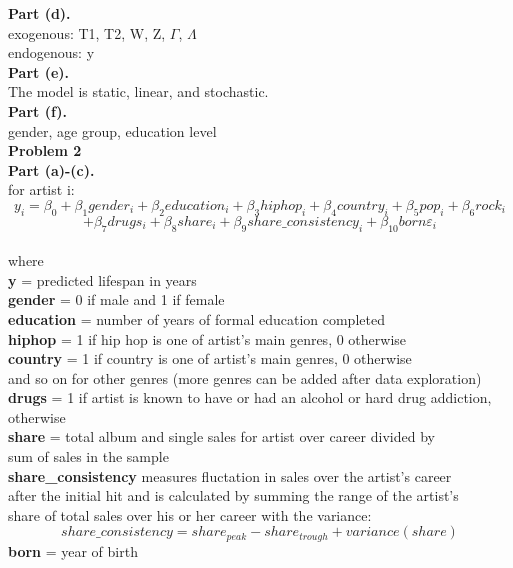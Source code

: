 \documentclass[letterpaper,12pt]{article}
\theoremstyle{definition}
\begin{document}
\noindent\textbf {Part (d).} \\
exogenous: T1, T2, W, Z, \(\Gamma \), \(\Lambda \) \\
endogenous: y \\

\noindent
\textbf {Part (e).} \\
The model is static, linear, and stochastic. \\

\noindent
\textbf {Part (f).} \\
gender, age group, education level \\

\noindent\textbf{Problem 2} \\
\textbf {Part (a)-(c).} \\
\noindent
for artist i: 
\[y_i = \beta_0 + \beta_1gender_i + \beta_2education_i + \beta_3hiphop_i + \beta_4country_i + \beta_5pop_i + \beta_6rock_i \]
\[+ \beta_7drugs_i + \beta_8share_i + \beta_9share\_consistency_i + \beta_{10}born \varepsilon_i \]
\\
\noindent
where \\
\indent
\textbf{y} = predicted lifespan in years \\
\indent
\textbf{gender} = 0 if male and 1 if female \\
\indent
\textbf{education} = number of years of formal education completed \\
\indent
\textbf{hiphop} = 1 if hip hop is one of artist's main genres, 0 otherwise\\
\indent
\textbf{country} = 1 if country is one of artist's main genres, 0 otherwise\\
\indent\indent
and so on for other genres (more genres can be added after data exploration) \\
\indent
\textbf{drugs} = 1 if artist is known to have or had an alcohol or hard drug addiction, \\
\indent{} otherwise \\
\indent
\textbf{share} = total album and single sales for artist over career divided by \\
\indent\indent
sum of sales in the sample \\
\indent
\textbf{share\_consistency} measures fluctation in sales over the artist's career \\
\indent\indent
after the initial hit and is calculated by summing the range of the artist's\\
\indent\indent
share of total sales over  his or her career with the variance: 
\[share\_consistency = share_{peak} - share_{trough} + variance(share) \]
\indent
\textbf{born} = year of birth \\
\end{document}
